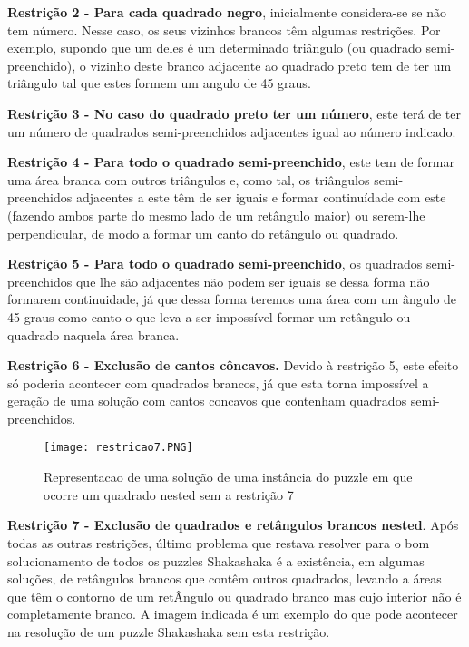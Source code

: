 \documentclass[runningheads]{llncs}
\begin{document}
\textbf{Restrição 2 - Para cada quadrado negro}, inicialmente considera-se se não tem número. Nesse caso, os seus vizinhos brancos têm algumas restrições. Por exemplo, supondo que  um deles é um determinado triângulo (ou quadrado semi-preenchido), o vizinho deste branco adjacente ao quadrado preto tem de ter um triângulo tal que estes formem um angulo de 45 graus. 

\textbf{Restrição 3 - No caso do quadrado preto ter um número}, este terá de ter um número de quadrados semi-preenchidos adjacentes igual ao número indicado.


\textbf{Restrição 4 - Para todo o quadrado semi-preenchido}, este tem de formar uma área branca com outros triângulos e, como tal, os triângulos semi-preenchidos adjacentes a este têm de ser iguais e formar continuídade com este (fazendo ambos parte do mesmo lado de um retângulo maior) ou serem-lhe perpendicular, de modo a formar um canto do retângulo ou quadrado.


\textbf{Restrição 5 - Para todo o quadrado semi-preenchido}, os quadrados semi-preenchidos que lhe são adjacentes não podem ser iguais se dessa forma não formarem continuidade, já que dessa forma teremos uma área com um ângulo de 45 graus como canto o que leva a ser impossível formar um retângulo ou quadrado naquela área branca.

\textbf{Restrição 6 - Exclusão de cantos côncavos.} Devido à restrição 5, este efeito só poderia acontecer com quadrados brancos, já que esta torna impossível a geração de uma solução com cantos concavos que contenham quadrados semi-preenchidos.

\begin{figure}
\begin{center}
\texttt{[image: restricao7.PNG]}
\caption{Representacao de uma solução de uma instância do puzzle em que ocorre um quadrado nested sem a restrição 7} \label{restricao7.PNG}
\end{center}
\end{figure}

\textbf{Restrição 7 - Exclusão de quadrados e retângulos brancos nested}. Após todas as outras restrições, último problema que restava resolver para o bom solucionamento de todos os puzzles Shakashaka é a existência, em algumas soluções, de retângulos brancos que contêm outros quadrados, levando a áreas que têm o contorno de um retÂngulo ou quadrado branco mas cujo interior não é completamente branco. A imagem indicada é um exemplo do que pode acontecer na resolução de um puzzle Shakashaka sem esta restrição.
\end{document}
